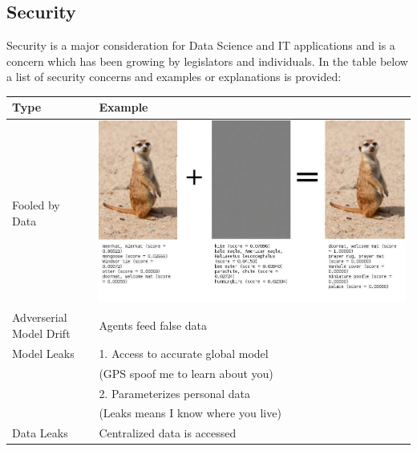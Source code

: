 \documentclass[12pt]{report}
\begin{document}
\subsection{Security}
Security is a major consideration for Data Science and IT applications and is a concern which has been growing by legislators and individuals.  In the table below a list of security concerns and examples or explanations is provided:\\ 
\begin{center}
\begin{tabular}{|l|l|}
\hline
\textbf{Type}           & \textbf{Example}                                                                                                                        \\ \hline
Fooled by Data          & \includegraphics[scale=0.3]{../Media/AdverserialExamples.png}                                                                                                                      \\ \hline
Adverserial Model Drift & Agents feed false data                                                                                                                  \\ \hline
Model Leaks             & 1. Access to accurate global model \\
& \space (GPS spoof me to learn about you) \\
& 2. Parameterizes personal data \\
& \space (Leaks means I know where you live) \\ \hline
Data Leaks              & Centralized data is accessed                                                                                                            \\ \hline
\end{tabular}
\end{center}
\end{document}
